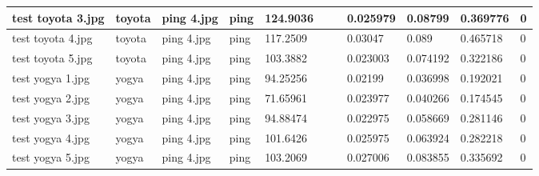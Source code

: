 \begin{landscape}
\begin{longtable}{|p{2cm}|p{1.5cm}|p{2cm}|p{1.5cm}|p{2cm}|p{1cm}|p{2cm}|p{2cm}|p{2cm}|p{2cm}|p{1cm}|}
		test toyota 3.jpg    & toyota           & ping 4.jpg            & ping                        & 124.9036              &                         &                            & 0.025979              & 0.08799               & 0.369776                 & 0                \\ \hline
		test toyota 4.jpg    & toyota           & ping 4.jpg            & ping                        & 117.2509              &                         &                            & 0.03047               & 0.089                 & 0.465718                 & 0                \\ \hline
		test toyota 5.jpg    & toyota           & ping 4.jpg            & ping                        & 103.3882              &                         &                            & 0.023003              & 0.074192              & 0.322186                 & 0                \\ \hline
		test yogya 1.jpg     & yogya            & ping 4.jpg            & ping                        & 94.25256              &                         &                            & 0.02199               & 0.036998              & 0.192021                 & 0                \\ \hline
		test yogya 2.jpg     & yogya            & ping 4.jpg            & ping                        & 71.65961              &                         &                            & 0.023977              & 0.040266              & 0.174545                 & 0                \\ \hline
		test yogya 3.jpg     & yogya            & ping 4.jpg            & ping                        & 94.88474              &                         &                            & 0.022975              & 0.058669              & 0.281146                 & 0                \\ \hline
		test yogya 4.jpg     & yogya            & ping 4.jpg            & ping                        & 101.6426              &                         &                            & 0.025975              & 0.063924              & 0.282218                 & 0                \\ \hline
		test yogya 5.jpg     & yogya            & ping 4.jpg            & ping                        & 103.2069              &                         &                            & 0.027006              & 0.083855              & 0.335692                 & 0                \\ \hline
	\end{longtable}
\end{landscape}


